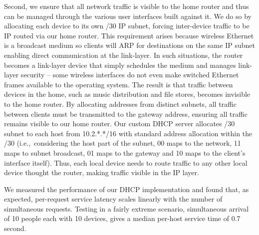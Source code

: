 Second, we ensure that all network traffic is visible to the home router and
thus can be managed through the various user interfaces built against it.  We do
so by allocating each device to its own /30 IP subnet, forcing inter-device
traffic to be IP routed via our home router.  This requirement arises because
wireless Ethernet is a broadcast medium so clients will ARP for destinations on
the same IP subnet enabling direct communication at the link-layer.  In such
situations, the router becomes a link-layer device that simply schedules the
medium and manages link-layer security -- some wireless interfaces do not even
make switched Ethernet frames available to the operating system. The result
is that traffic between devices in the
home, such as music distribution and file stores, becomes invisible to the
home router.  By allocating addresses from distinct subnets, all traffic
between clients must be transmitted to the gateway address, ensuring all
traffic remains visible to our home router. 
Our custom DHCP server allocates /30 subnet to each host from 10.2.*.*/16 with
standard address allocation within the /30 (i.e.,~considering the host part of
the subnet, 00 maps to the network, 11 maps to subnet broadcast, 01 maps to the
gateway and 10 maps to the client's interface itself). Thus, each local device
needs to route traffic to any other local device thought the router, making
traffic visible in the IP layer.
%

We measured the performance of our DHCP implementation and found that, as
expected, per-request service latency scales linearly with the number of
simultaneous requests.  Testing in a fairly extreme scenario, simultaneous
arrival of 10 people each with 10 devices,  gives a median per-host service time
of 0.7 second.

